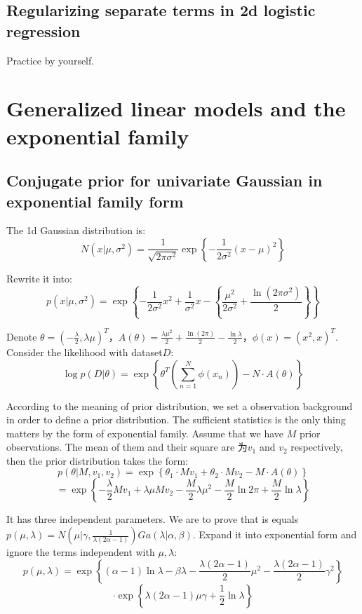 \documentclass[UTF8]{ctexart}
\begin{document}
\subsection{Regularizing separate terms in 2d logistic regression}
Practice by yourself.

\newpage
\section{Generalized linear models and the exponential family}
\subsection{Conjugate prior for univariate Gaussian in exponential family form}
The 1d Gaussian distribution is:
$$N(x|\mu,\sigma^{2})=\frac{1}{\sqrt{2\pi \sigma^{2}}}\exp\left\{-\frac{1}{2\sigma^{2}}(x-\mu)^{2} \right\}$$

Rewrite it into:
$$p(x|\mu,\sigma^{2})=\exp\left\{-\frac{1}{2\sigma^{2}}x^{2} + \frac{1}{\sigma^{2}}x -\left\{\frac{\mu^{2}}{2\sigma^{2}}+\frac{\ln(2\pi\sigma^{2})}{2}\right\}  \right\}$$

Denote $\theta = (-\frac{\lambda}{2},\lambda\mu)^{T}$，$A(\theta) =\frac{\lambda\mu^{2}}{2}+\frac{\ln(2\pi)}{2}-\frac{\ln \lambda}{2}$，$\phi(x)=(x^{2},x)^{T}$. Consider the likelihood with dataset$D$:
$$\log p(D|\theta) = \exp\left\{ \theta^{T}(\sum_{n=1}^{N}\phi(x_{n})) -N\cdot A(\theta) \right\}$$

According to the meaning of prior distribution, we set a observation background in order to define a prior distribution. The sufficient statistics is the only thing matters by the form of exponential family. Assume that we have $M$ prior observations. The mean of them and their square are 为$v_{1}$ and $v_{2}$ respectively, then the prior distribution takes the form:
$$p(\theta|M,v_{1},v_{2})=\exp\left\{ \theta_{1}\cdot Mv_{1} + \theta_{2}\cdot Mv_{2} - M\cdot A(\theta) \right\}$$
$$=\exp\left\{-\frac{\lambda}{2}Mv_{1}+\lambda\mu Mv_{2} - \frac{M}{2}\lambda\mu^{2}-\frac{M}{2}\ln 2\pi + \frac{M}{2}\ln \lambda  \right\}$$

It has three independent parameters. We are to prove that is equals $p(\mu,\lambda)=N(\mu|\gamma,\frac{1}{\lambda(2\alpha-1)})Ga(\lambda|\alpha,\beta)$. Expand it into exponential form and ignore the terms independent with $\mu,\lambda$:
$$p(\mu,\lambda)=\exp\left\{ (\alpha-1)\ln \lambda - \beta\lambda -\frac{\lambda(2\alpha-1)}{2}\mu^{2}-\frac{\lambda(2\alpha-1)}{2}\gamma^{2}\right\}$$
$$\cdot\exp\left\{\lambda(2\alpha-1)\mu\gamma+\frac{1}{2}\ln \lambda \right\}$$
\end{document}
